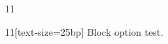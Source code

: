 \documentclass[paper=A4]{ropas-poster}
\begin{document}
\begin{postergrid}{1}{1}
\begin{posterblock}{1}{1}[text-size=25bp]
Block option test.
\end{posterblock}
\end{postergrid}
\end{document}
